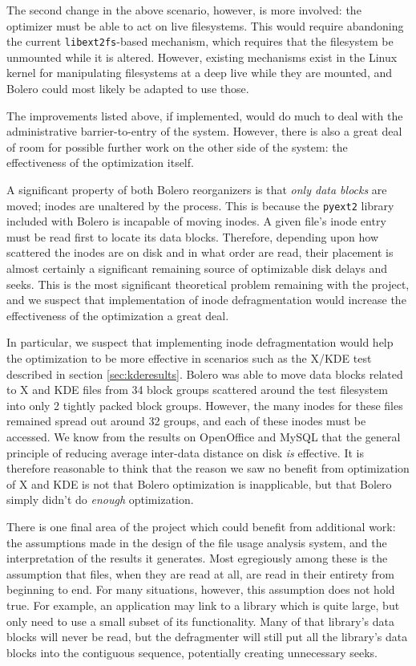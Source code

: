 \documentclass[10pt,twocolumn,letterpaper]{article}
\begin{document}
The second change in the above scenario, however, is more involved: the optimizer must be able to act on live filesystems. This would require abandoning the current \texttt{libext2fs}-based mechanism, which requires that the filesystem be unmounted while it is altered. However, existing mechanisms exist in the Linux kernel for manipulating filesystems at a deep live while they are mounted\cite{ext3online}, and Bolero could most likely be adapted to use those.

The improvements listed above, if implemented, would do much to deal with the administrative barrier-to-entry of the system. However, there is also a great deal of room for possible further work on the other side of the system: the effectiveness of the optimization itself.

A significant property of both Bolero reorganizers is that \emph{only data blocks} are moved; inodes are
unaltered by the process. This is because the \texttt{pyext2} library included with Bolero is incapable of moving inodes.  A given file's inode entry must be read first to locate its data blocks. Therefore, depending upon how scattered the inodes are on disk and in what order are read, their placement is almost certainly a significant remaining source of optimizable disk delays and seeks. This is the most significant theoretical problem remaining with the project, and we suspect that implementation of inode defragmentation would increase the effectiveness of the optimization a great deal.

In particular, we suspect that implementing inode defragmentation would help the optimization to be more effective in scenarios such as the X/KDE test described in section \ref{sec:kderesults}. Bolero was able to move data blocks related to X and KDE files from 34 block groups scattered around the test filesystem into only 2 tightly packed block groups. However, the many inodes for these files remained spread out around 32 groups, and each of these inodes must be accessed. We know from the results on OpenOffice and MySQL that the general principle of reducing average inter-data distance on disk \emph{is} effective. It is therefore reasonable to think that the reason we saw no benefit from optimization of X and KDE is not that Bolero optimization is inapplicable, but that Bolero simply didn't do \emph{enough} optimization.

There is one final area of the project which could benefit from additional work: the assumptions made in the design of the file usage analysis system, and the interpretation of the results it generates. Most egregiously among these is the assumption that files, when they are read at all, are read in their entirety from beginning to end. For many situations, however, this assumption does not hold true. For example, an application may link to a library which is quite large, but only need to use a small subset of its functionality. Many of that library's data blocks will never be read, but the defragmenter will still put all the library's data blocks into the contiguous sequence, potentially creating unnecessary seeks.
\end{document}
